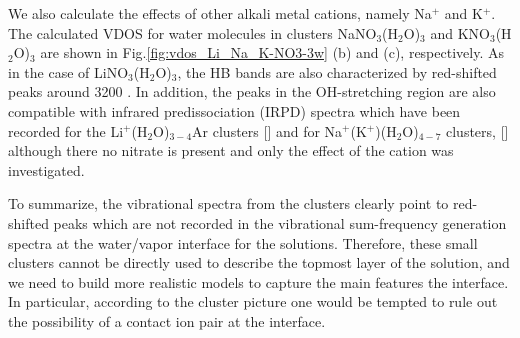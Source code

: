 %

We also calculate the effects of other alkali metal cations, namely Na$^+$ and K$^+$. 
The calculated VDOS for water molecules in clusters NaNO$_3$(H$_2$O)$_3$ and KNO$_3$(H$_2$O)$_3$ are shown in 
Fig.\thinspace\ref{fig:vdos_Li_Na_K-NO3-3w} (b) and (c), respectively. As in the case of LiNO$_3$(H$_2$O)$_3$, the HB 
bands are also characterized by red-shifted peaks around 3200 \centimeter.
In addition, the peaks in the OH-stretching region are also compatible with infrared predissociation
(IRPD) spectra which have been recorded for the Li$^+$(H$_2$O)$_{3-4}$Ar
clusters [\cite{rodriguez2011, Miller2008, Miller2008b}]
and for Na$^+$(K$^+$)(H$_2$O)$_{4-7}$ clusters, [\cite{beck2011}] although there no
nitrate is present and only the effect of the cation was investigated.

To summarize, the vibrational spectra from the clusters clearly point to red-shifted peaks which are not 
recorded in the vibrational sum-frequency generation spectra at the water/vapor interface for the \LiN solutions. 
Therefore, these small clusters cannot be directly used to describe the topmost layer of the \LiN solution, 
and we need to build more realistic models to capture the main features the interface. 
In particular, according to the cluster picture one would be tempted to rule out the possibility of a contact 
ion pair at the interface.

